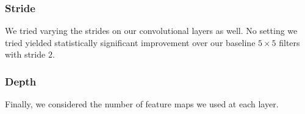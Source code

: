 \documentclass{article}
\begin{document}
\begin{multicols}{2}


\subsubsection{Stride}

We tried varying the strides on our convolutional layers as well.
No setting we tried yielded statistically significant improvement
over our baseline $5\times 5$ filters with stride $2$.


\subsubsection{Depth}

Finally, we considered the number of feature maps
we used at each layer.









\end{multicols}
\end{document}
